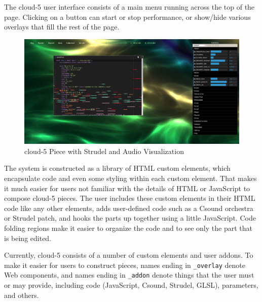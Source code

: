 \documentclass[runningheads,a4paper]{llncs}
\begin{document}
The cloud-5 user interface consists of a main menu running across the top of the page. Clicking on a button can start or stop performance, or show/hide various overlays that fill the rest of the page. 

\begin{figure}
\centering
\includegraphics[width=0.90\linewidth]{cloud5}
\caption{cloud-5 Piece with Strudel and Audio Visualization}
\label{fig:cloud5}
\end{figure}

The system is constructed as a library of HTML custom elements, which encapsulate code and even some styling within each custom element. That makes it much easier for users not familiar with the details of HTML or JavaScript to compose cloud-5 pieces. The user includes these custom elements in their HTML code like any other elements, adds user-defined code such as a Csound orchestra or Strudel patch, and hooks the parts up together using a little JavaScript. Code folding regions make it easier to organize the code and to see only the part that is being edited. 

Currently, cloud-5 consists of a number of custom elements and user addons. To make it easier for users to construct pieces, names ending in \texttt{\_overlay} denote Web components, and names ending in \texttt{\_addon} denote things that the user must or may provide, including code (JavaScript, Csound, Strudel, GLSL), parameters, and others.
\end{document}
